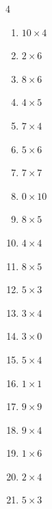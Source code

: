 \begin{multicols}{4}
\begin{enumerate}
  \item $10\times 4$
        \phantom{$=40$}

  \item $2\times 6$
        \phantom{$=12$}

  \item $8\times 6$
        \phantom{$=48$}

\columnbreak %

  \item $4\times 5$
        \phantom{$=20$}

  \item $7\times 4$
        \phantom{$=28$}

  \item $5\times 6$
        \phantom{$=30$}

  \item $7\times 7$
        \phantom{$=49$}

  \item $0\times 10$
        \phantom{$=0$}

  \item $8\times 5$
        \phantom{$=40$}

  \item $4\times 4$
        \phantom{$=16$}

  \item $8\times 5$
        \phantom{$=40$}

  \item $5\times 3$
        \phantom{$=15$}

  \item $3\times 4$
        \phantom{$=12$}

  \item $3\times 0$
        \phantom{$=0$}

  \item $5\times 4$
        \phantom{$=20$}

  \item $1\times 1$
        \phantom{$=1$}

  \item $9\times 9$
        \phantom{$=81$}

  \item $9\times 4$
        \phantom{$=36$}

  \item $1\times 6$
        \phantom{$=6$}

  \item $2\times 4$
        \phantom{$=8$}

  \item $5\times 3$
        \phantom{$=15$}


\end{enumerate}
\end{multicols}
